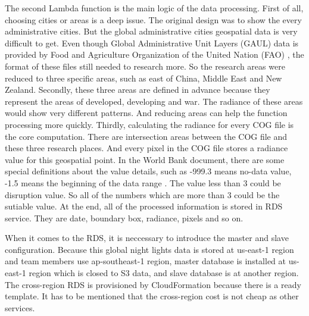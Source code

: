 \documentclass[conference]{IEEEtran}
\begin{document}
The second Lambda function is the main logic of the data processing. First of all, choosing cities or areas is a deep issue. The original design was to show the every administrative 
cities. But the global administrative cities geospatial data is very difficult to get. Even though Global Administrative Unit Layers (GAUL) data is provided by Food and 
Agriculture Organization of the United Nation (FAO) \cite{GlobalAd98:online}, the format of these files still needed to research more. So the research areas were reduced 
to three specific areas, such as east of China, Middle East and New Zealand. Secondly, these three areas are defined in advance because they represent the areas of developed, 
developing and war. The radiance of these areas would show very different patterns. And reducing areas can help the function processing more quickly. Thirdly, calculating the 
radiance for every COG file is the core computation. There are intersection areas between the COG file and these three research places. And every pixel in the COG file stores 
a radiance value for this geospatial point. In the World Bank document, there are some special definitions about the value details, such as -999.3 means no-data value, -1.5 
means the beginning of the data range \cite{WorldBan13:online}. The value less than 3 could be disruption value. So all of the numbers which are more than 3 could be the 
sutiable value. At the end, all of the processed information is stored in RDS service. They are date, boundary box, radiance, pixels and so on.

When it comes to the RDS, it is neccessary to introduce the master and slave configuration. Because this global night lights data is stored at us-east-1 region and team members 
use ap-southeast-1 region, master database is installed at us-east-1 region which is closed to S3 data, and slave database is at another region. The cross-region RDS is 
provisioned by CloudFormation because there is a ready template. It has to be mentioned that the cross-region cost is not cheap as other services.
\end{document}
